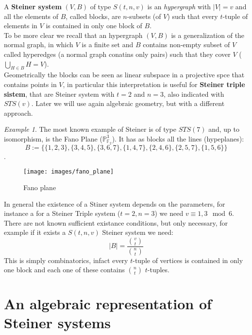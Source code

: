 \documentclass[]{book}
\theoremstyle{plain}
\theoremstyle{remark}
\newtheorem{ex}[rem]{Example}
\theoremstyle{definition}
\newcommand{\PP}{\mathbb{P}}
\begin{document}
A \textbf{Steiner system} $ (V,B) $ of type $ S(t,n,v) $ is an \textit{hypergraph} with $ |V|=v $ and all the elements of $ B $, called blocks, are $ n $-subsets (of $ V $) such that every $ t $-tuple of elements in $ V $ is contained in only one block of $ B $. \\
To be more clear we recall that an hypergraph $ (V,B) $ is a generalization of the normal graph, in which $ V $ is a finite set and $ B $ contains non-empty subset of $ V $ called hyperedges (a normal graph conatins only pairs) such that they cover $ V $ ($ \bigcup_{H \in B} H = V $).\\
Geometrically the blocks can be seen as linear subspace in a projective spce that contains points in $ V $, in particular this interpretation is useful for \textbf{Steiner triple sistem}, that are Steiner system with $ t=2 $ and $ n=3 $, also indicated with $ STS(v) $. Later we will use again algebraic geometry, but with a different approach.

\begin{ex} \label{ex:fano1}
	The most known example of Steiner is of type $ STS(7) $ and, up to isomorphism, is the Fano Plane ($ \PP_{\mathbb{F}_2}^3 $). It has as blocks all the lines (hypeplanes):
	\[B := \{\{1, 2, 3\}, \{3, 4, 5\}, \{3, 6, 7\}, \{1, 4, 7\}, \{2, 4, 6\}, \{2, 5, 7\}, \{1, 5, 6\}\}\].
\end{ex}

\begin{verbatim*}
%Bho non va
\begin{figure}
\texttt{[image: images/fano\_plane]}
\caption{Fano plane}
\label{fig:fanoplane}
\end{figure}
\end{verbatim*}

In general the existence of a Stiner system depends on the parameters, for instance a for a Steiner Triple system ($ t=2, n=3 $) we need $ v \equiv 1,3 \mod 6 $. There are not known sufficient existance conditions, but only necessary, for example if it exists a $ S(t,n,v) $ Steiner system we need: 
\[
	|B| = \frac{\binom{v}{t}}{\binom{n}{t}}
\]
This is simply combinatorics, infact every $ t $-tuple of vertices is contained in only one block and each one of these contains $ \binom{n}{t} $ $ t $-tuples. 

\section[Ideal of Steyner configuartion]{An algebraic representation of Steiner systems}
\end{document}
